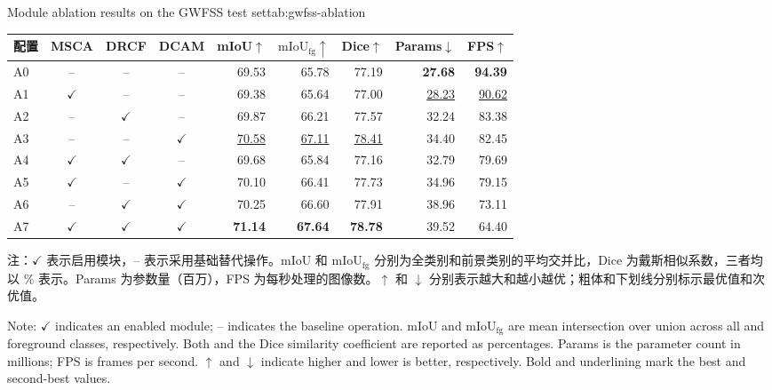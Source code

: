 \begin{table}[!htb]
  \centering
    {Module ablation results on the GWFSS test set}{tab:gwfss-ablation}
  \begin{spacing}{1.2}
    \small
    \setlength{\tabcolsep}{2pt}
    \renewcommand{\arraystretch}{1.15}
    \begin{tabular*}{\linewidth}{@{\extracolsep{\fill}}lcccrrrrr@{}}
      \toprule
      配置 & MSCA & DRCF & DCAM
        & mIoU\(\uparrow\) & \(\mathrm{mIoU}_{\mathrm{fg}}\uparrow\)
        & Dice\(\uparrow\) & Params\(\downarrow\) & FPS\(\uparrow\) \\
      \midrule
      A0 & -- & -- & --
        & 69.53 & 65.78 & 77.19 & \textbf{27.68} & \textbf{94.39} \\
      A1 & \(\checkmark\) & -- & --
        & 69.38 & 65.64 & 77.00 & \underline{28.23} & \underline{90.62} \\
      A2 & -- & \(\checkmark\) & --
        & 69.87 & 66.21 & 77.57 & 32.24 & 83.38 \\
      A3 & -- & -- & \(\checkmark\)
        & \underline{70.58} & \underline{67.11} & \underline{78.41} & 34.40 & 82.45 \\
      A4 & \(\checkmark\) & \(\checkmark\) & --
        & 69.68 & 65.84 & 77.16 & 32.79 & 79.69 \\
      A5 & \(\checkmark\) & -- & \(\checkmark\)
        & 70.10 & 66.41 & 77.73 & 34.96 & 79.15 \\
      A6 & -- & \(\checkmark\) & \(\checkmark\)
        & 70.25 & 66.60 & 77.91 & 38.96 & 73.11 \\
      \midrule
      A7 & \(\checkmark\) & \(\checkmark\) & \(\checkmark\)
        & \textbf{71.14} & \textbf{67.64} & \textbf{78.78} & 39.52 & 64.40 \\
      \bottomrule
    \end{tabular*}
  \end{spacing}
  \par\vspace{8pt}
  \noindent\begin{minipage}{\linewidth}
    \normalfont{}\raggedright
    \noindent 注：\(\checkmark\) 表示启用模块，-- 表示采用基础替代操作。mIoU 和 \(\mathrm{mIoU}_{\mathrm{fg}}\) 分别为全类别和前景类别的平均交并比，Dice 为戴斯相似系数，三者均以 \% 表示。Params 为参数量（百万），FPS 为每秒处理的图像数。\(\uparrow\) 和 \(\downarrow\) 分别表示越大和越小越优；粗体和下划线分别标示最优值和次优值。\par
    \vspace{2pt}
    \noindent Note: \(\checkmark\) indicates an enabled module; -- indicates the baseline operation. mIoU and \(\mathrm{mIoU}_{\mathrm{fg}}\) are mean intersection over union across all and foreground classes, respectively. Both and the Dice similarity coefficient are reported as percentages. Params is the parameter count in millions; FPS is frames per second. \(\uparrow\) and \(\downarrow\) indicate higher and lower is better, respectively. Bold and underlining mark the best and second-best values.\par
  \end{minipage}\par
\end{table}

